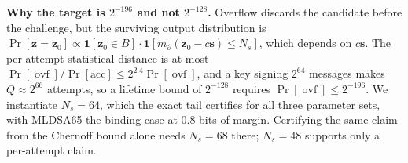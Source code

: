 \documentclass[10pt,letterpaper]{article}
\newcommand{\vct}[1]{\bm{#1}}
\newcommand{\one}{\mathbf{1}}
\newcommand{\ovf}{\operatorname{ovf}}
\begin{document}
\textbf{Why the target is $2^{-196}$ and not $2^{-128}$.}
Overflow discards the candidate before the challenge, but the surviving output
distribution is $\Pr[\vct{z}=\vct{z}_0]\propto
\one[\vct{z}_0\in B]\cdot\one[m_\partial(\vct{z}_0-c\vct{s})\leq N_s]$,
which depends on $c\vct{s}$. The per-attempt statistical distance is at most
$\Pr[\ovf]/\Pr[\mathrm{acc}]\leq2^{2.4}\Pr[\ovf]$, and a key signing $2^{64}$
messages makes $Q\approx2^{66}$ attempts, so a lifetime bound of $2^{-128}$
requires $\Pr[\ovf]\leq2^{-196}$. We instantiate $N_s=64$, which the exact tail
certifies for all three parameter sets, with MLDSA65 the binding case at 0.8 bits
of margin. Certifying the same claim from the Chernoff bound alone needs $N_s=68$
there; $N_s=48$ supports only a per-attempt claim.
\end{document}
